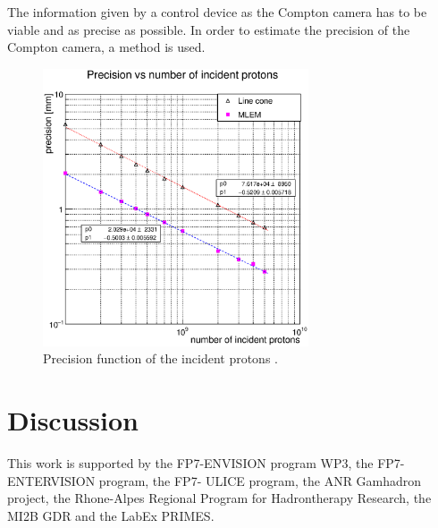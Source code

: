 \documentclass[12pt]{iopart}
\begin{document}
The information given by a control device as the Compton camera has to be viable and as precise as possible. In order to estimate the precision of the Compton camera, a method is used. 

	\begin{figure} [!hbtp]	
	\centering
	\caption{Precision function of the incident protons .}	
	\includegraphics[width=0.7\textwidth]{./Figure/Precision/2017-08-02_Precision_Comparaison_linecone_MLEM_Article_Fit.eps}
	\end{figure}

\newpage
\section{Discussion}


\newpage
\ack

This work is supported by the FP7-ENVISION program WP3, the FP7-ENTERVISION program, the FP7- ULICE program, the ANR Gamhadron project, the Rhone-Alpes Regional Program for Hadrontherapy Research, the MI2B GDR and the LabEx PRIMES.\newline



\end{document}

